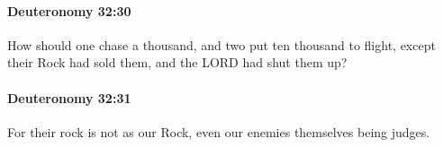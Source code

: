 		\paragraph{Deuteronomy 32:30} %
			\label{DEUTERONOMY-32-30}

			How should one chase a thousand, and two put ten thousand to flight, except their Rock had sold them, and the LORD had shut them up?


		\paragraph{Deuteronomy 32:31} %
			\label{DEUTERONOMY-32-31}

			For their rock is not as our Rock, even our enemies themselves being judges.


